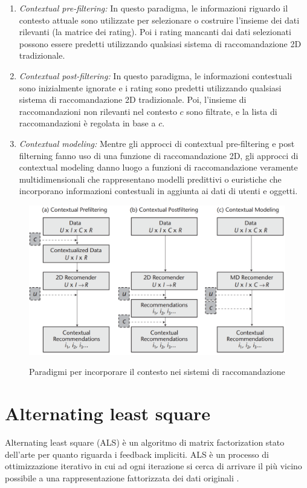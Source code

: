 \begin{enumerate}
 \item \textit{Contextual pre-filtering:} In questo paradigma, le informazioni riguardo il contesto attuale sono utilizzate per selezionare o costruire l'insieme dei dati rilevanti (la matrice dei rating). Poi i rating mancanti dai dati selezionati possono essere predetti utilizzando qualsiasi sistema di raccomandazione 2D tradizionale.
 \item \textit{Contextual post-filtering:} In questo paradigma, le informazioni contestuali sono inizialmente ignorate e i rating sono predetti utilizzando qualsiasi sistema di raccomandazione 2D tradizionale. Poi, l'insieme di raccomandazioni non rilevanti nel contesto $c$ sono filtrate, e la lista di raccomandazioni è regolata in base a $c$.
 \item  \textit{Contextual modeling:} Mentre gli approcci di contextual pre-filtering e post filterning fanno uso di una funzione di raccomandazione 2D, gli approcci di contextual modeling danno luogo a funzioni di raccomandazione veramente multidimensionali che rappresentano modelli predittivi o euristiche che incorporano informazioni contestuali in aggiunta ai dati di utenti e oggetti.
\end{enumerate}

\begin{figure}
  \centering
  \includegraphics[width=\linewidth]{immagini/paradigm_for_context_inclusion.png}
  \caption{Paradigmi per incorporare il contesto nei sistemi di raccomandazione}
  \cite{context-paradigm}
  \label{fig:context-paradigm}
\end{figure}

\section{Alternating least square}
Alternating least square (ALS) \cite{als} è un algoritmo di matrix factorization stato dell'arte per quanto riguarda i feedback impliciti. ALS è un processo di ottimizzazione iterativo in cui ad ogni iterazione si cerca di arrivare il più vicino possibile a una rappresentazione fattorizzata dei dati originali \cite{als-medium}. 

